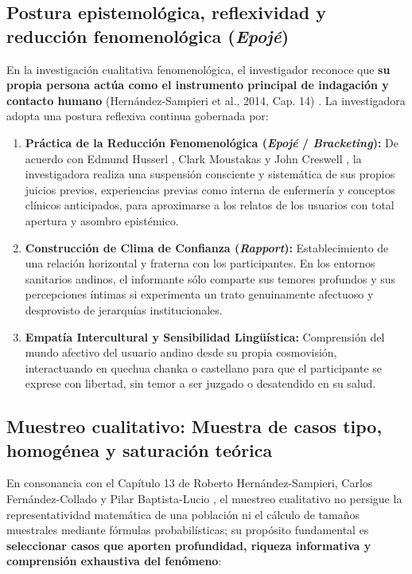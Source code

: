 \subsection{Postura epistemológica, reflexividad y reducción fenomenológica (\textit{Epojé})}
\label{sec:4.3_postura}
En la investigación cualitativa fenomenológica, el investigador reconoce que \textbf{su propia persona actúa como el instrumento principal de indagación y contacto humano} (Hernández-Sampieri et al., 2014, Cap. 14) \cite{sampieri2018}. La investigadora adopta una postura reflexiva continua gobernada por:

\begin{enumerate}
    \item \textbf{Práctica de la Reducción Fenomenológica (\textit{Epojé} / \textit{Bracketing}):} De acuerdo con Edmund Husserl \cite{husserl1949}, Clark Moustakas \cite{moustakas1994} y John Creswell \cite{creswell2013}, la investigadora realiza una suspensión consciente y sistemática de sus propios juicios previos, experiencias previas como interna de enfermería y conceptos clínicos anticipados, para aproximarse a los relatos de los usuarios con total apertura y asombro epistémico.
    \item \textbf{Construcción de Clima de Confianza (\textit{Rapport}):} Establecimiento de una relación horizontal y fraterna con los participantes. En los entornos sanitarios andinos, el informante sólo comparte sus temores profundos y sus percepciones íntimas si experimenta un trato genuinamente afectuoso y desprovisto de jerarquías institucionales.
    \item \textbf{Empatía Intercultural y Sensibilidad Lingüística:} Comprensión del mundo afectivo del usuario andino desde su propia cosmovisión, interactuando en quechua chanka o castellano para que el participante se exprese con libertad, sin temor a ser juzgado o desatendido en su salud.
\end{enumerate}

\subsection{Muestreo cualitativo: Muestra de casos tipo, homogénea y saturación teórica}
\label{sec:4.4_muestra}
En consonancia con el Capítulo 13 de Roberto Hernández-Sampieri, Carlos Fernández-Collado y Pilar Baptista-Lucio \cite{sampieri2018}, el muestreo cualitativo no persigue la representatividad matemática de una población ni el cálculo de tamaños muestrales mediante fórmulas probabilísticas; su propósito fundamental es \textbf{seleccionar casos que aporten profundidad, riqueza informativa y comprensión exhaustiva del fenómeno}:

